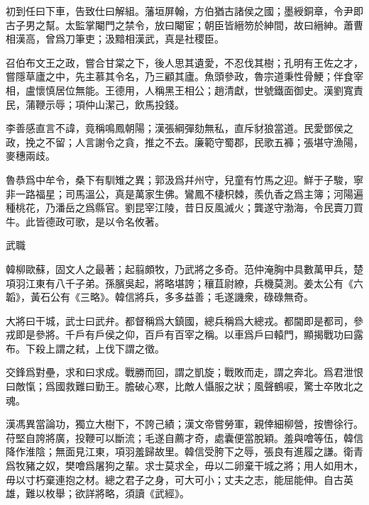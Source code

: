 \documentclass[12pt,a4paper]{ctexbook}
\begin{document}
初到任曰下車，告致仕曰解組。藩垣屏翰，方伯猶古諸侯之國；墨綬銅章，令尹即古子男之幫。太監掌閹門之禁令，放曰閹宦；朝臣皆縉笏於紳間，故曰縉紳。蕭曹相漢高，曾爲刀筆吏；汲黯相漢武，真是社稷臣。\par
召伯布文王之政，嘗合甘棠之下，後人思其遺愛，不忍伐其樹；孔明有王佐之才，嘗隱草廬之中，先主慕其令名，乃三顧其廬。魚頭參政，魯宗道秉性骨鯁；伴食宰相，盧懷慎居位無能。王德用，人稱黑王相公；趙清獻，世號鐵面御史。漢劉寬責民，蒲鞭示辱；項仲山潔己，飲馬投錢。\par
李善感直言不諱，竟稱鳴鳳朝陽；漢張綱彈劾無私，直斥豺狼當道。民愛鄧侯之政，挽之不留；人言謝令之貪，推之不去。廉範守蜀郡，民歌五褲；張堪守漁陽，麥穗兩歧。\par
魯恭爲中牟令，桑下有馴雉之異；郭汲爲幷州守，兒童有竹馬之迎。鮮于子駿，寧非一路福星；司馬溫公，真是萬家生佛。鸞鳳不棲枳棘，羨仇香之爲主簿；河陽遍種桃花，乃潘岳之爲縣官。劉昆宰江陵，昔日反風滅火；龔遂守渤海，令民賣刀買牛。此皆德政可歌，是以令名攸著。\par
武職\par
韓柳歐蘇，固文人之最著；起翦頗牧，乃武將之多奇。范仲淹胸中具數萬甲兵，楚項羽江東有八千子弟。孫臏吳起，將略堪誇；穰苴尉繚，兵機莫測。姜太公有《六韜》，黃石公有《三略》。韓信將兵，多多益善；毛遂譏衆，碌碌無奇。\par
大將曰干城，武士曰武弁。都督稱爲大鎮國，總兵稱爲大總戎。都閫即是都司，參戎即是參將。千戶有戶侯之仰，百戶有百宰之稱。以車爲戶曰轅門，顯揭戰功曰露布。下殺上謂之弒，上伐下謂之徵。\par
交鋒爲對壘，求和曰求成。戰勝而回，謂之凱旋；戰敗而走，謂之奔北。爲君泄恨曰敵愾；爲國救難曰勤王。膽破心寒，比敵人懾服之狀；風聲鶴唳，驚士卒敗北之魂。\par
漢馮異當論功，獨立大樹下，不誇己績；漢文帝嘗勞軍，親倖細柳營，按轡徐行。苻堅自誇將廣，投鞭可以斷流；毛遂自薦才奇，處囊便當脫穎。羞與噲等伍，韓信降作淮陰；無面見江東，項羽羞歸故里。韓信受胯下之辱，張良有進履之謙。衛青爲牧豬之奴，樊噲爲屠狗之輩。求士莫求全，毋以二卵棄干城之將；用人如用木，毋以寸朽棄連抱之材。總之君子之身，可大可小；丈夫之志，能屈能伸。自古英雄，難以枚舉；欲詳將略，須讀《武經》。\par
\end{document}
